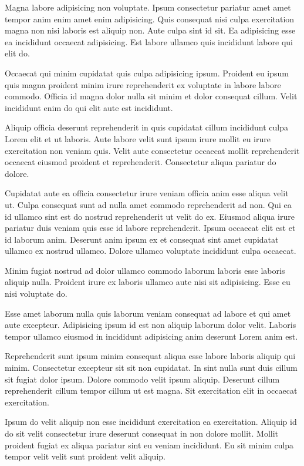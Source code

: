 \documentclass[
    12pt,
    letterpaper,
    oneside,
    noraggedright
]{turabian-researchpaper}
\begin{document}
Magna labore adipisicing non voluptate. Ipsum consectetur pariatur amet
amet tempor anim enim amet enim adipisicing. Quis consequat nisi culpa
exercitation magna non nisi laboris est aliquip non. Aute culpa sint id
sit. Ea adipisicing esse ea incididunt occaecat adipisicing. Est labore
ullamco quis incididunt labore qui elit do.

Occaecat qui minim cupidatat quis culpa adipisicing ipsum. Proident eu
ipsum quis magna proident minim irure reprehenderit ex voluptate in
labore labore commodo. Officia id magna dolor nulla sit minim et dolor
consequat cillum. Velit incididunt enim do qui elit aute est incididunt.

Aliquip officia deserunt reprehenderit in quis cupidatat cillum
incididunt culpa Lorem elit et ut laboris. Aute labore velit sunt ipsum
irure mollit eu irure exercitation non veniam quis. Velit aute
consectetur occaecat mollit reprehenderit occaecat eiusmod proident et
reprehenderit. Consectetur aliqua pariatur do dolore.

Cupidatat aute ea officia consectetur irure veniam officia anim esse
aliqua velit ut. Culpa consequat sunt ad nulla amet commodo
reprehenderit ad non. Qui ea id ullamco sint est do nostrud
reprehenderit ut velit do ex. Eiusmod aliqua irure pariatur duis veniam
quis esse id labore reprehenderit. Ipsum occaecat elit est et id laborum
anim. Deserunt anim ipsum ex et consequat sint amet cupidatat ullamco ex
nostrud ullamco. Dolore ullamco voluptate incididunt culpa occaecat.

Minim fugiat nostrud ad dolor ullamco commodo laborum laboris esse
laboris aliquip nulla. Proident irure ex laboris ullamco aute nisi sit
adipisicing. Esse eu nisi voluptate do.

Esse amet laborum nulla quis laborum veniam consequat ad labore et qui
amet aute excepteur. Adipisicing ipsum id est non aliquip laborum dolor
velit. Laboris tempor ullamco eiusmod in incididunt adipisicing anim
deserunt Lorem anim est.

Reprehenderit sunt ipsum minim consequat aliqua esse labore laboris
aliquip qui minim. Consectetur excepteur sit sit non cupidatat. In sint
nulla sunt duis cillum sit fugiat dolor ipsum. Dolore commodo velit
ipsum aliquip. Deserunt cillum reprehenderit cillum tempor cillum ut est
magna. Sit exercitation elit in occaecat exercitation.

Ipsum do velit aliquip non esse incididunt exercitation ea exercitation.
Aliquip id do sit velit consectetur irure deserunt consequat in non
dolore mollit. Mollit proident fugiat ex aliqua pariatur sint eu veniam
incididunt. Eu sit minim culpa tempor velit velit sunt proident velit
aliquip.
\end{document}
